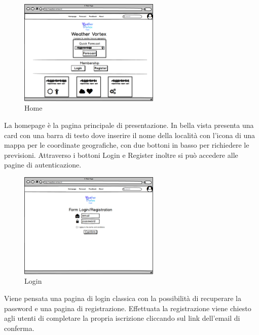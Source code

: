 \begin{figure}[H]
    \caption{Home}
    \label{fig:Home}
    \centering
    \includegraphics[width=0.6\textwidth]{MockUps/homepage.png}
\end{figure}
La homepage è la pagina principale di presentazione.
In bella vista presenta una card con una barra di testo dove inserire il nome della località con l'icona di una mappa per le coordinate geografiche, con due bottoni in basso per richiedere le previsioni. 
Attraverso i bottoni Login e Register inoltre si può accedere alle pagine di autenticazione.

\begin{figure}[H]
    \caption{Login}
    \label{fig:Login}
    \centering
    \includegraphics[width=0.6\textwidth]{MockUps/Login_Register.png}
\end{figure}
Viene pensata una pagina di login classica con la possibilità di recuperare la password e una pagina di registrazione. Effettuata la registrazione viene chiesto agli utenti di completare la propria iscrizione cliccando sul link dell'email di conferma.

